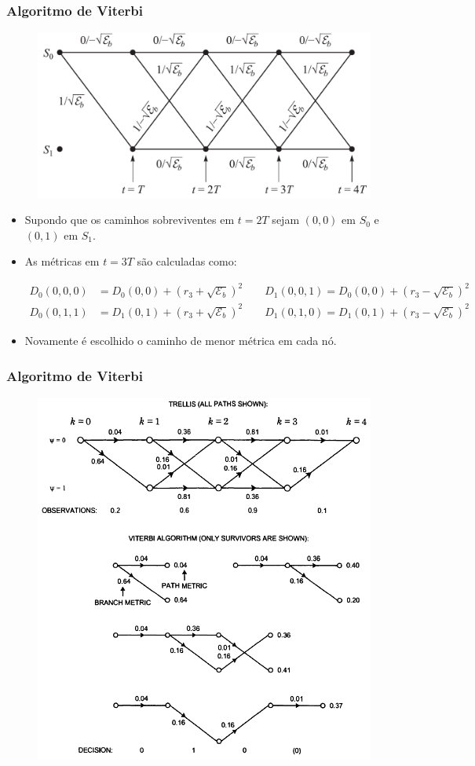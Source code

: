 \begin{frame}
	\frametitle{Algoritmo de Viterbi}

	\vspace{-0.3cm}
	\begin{figure}[t]	
	  \begin{center}
	    \includegraphics[width=0.5\columnwidth]{figs/pam_38}
	  \end{center}\vspace{-0.5cm}
	\end{figure}
	\begin{itemize}
	    \item Supondo que os caminhos sobreviventes em $t=2T$ sejam $(0,0)$ em $S_0$ e $(0,1)$ em $S_1$.
	    \item As métricas em $t=3T$ são calculadas como:
	    \begin{small}
	    \begin{align*}
		D_0(0,0,0) &= D_0(0,0) + (r_3 + \sqrt{\mathcal{E}_b})^2 \qquad D_1(0,0,1) = D_0(0,0) + (r_3 - \sqrt{\mathcal{E}_b})^2 \\
		D_0(0,1,1) &= D_1(0,1) + (r_3 + \sqrt{\mathcal{E}_b})^2 \qquad D_1(0,1,0) = D_1(0,1) + (r_3 - \sqrt{\mathcal{E}_b})^2
	    \end{align*}
	    \end{small}
	    \item Novamente é escolhido o caminho de menor métrica em cada nó.
	\end{itemize}
\end{frame}

\begin{frame}
	\frametitle{Algoritmo de Viterbi}

	\begin{figure}[t]	
	  \begin{center}
	    \includegraphics[width=0.58\columnwidth]{figs/pam_40}
	  \end{center}
	\end{figure}
\end{frame}

